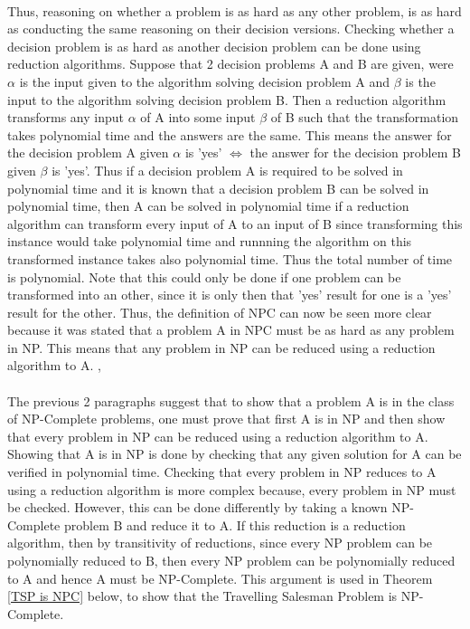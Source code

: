 \documentclass{article}
\begin{document}
\\
Thus, reasoning on whether a problem is as hard as any other problem, is as hard as conducting the same reasoning on their decision versions. Checking whether a decision problem is as hard as another decision problem can be done using reduction algorithms. Suppose that 2 decision problems A and B are given, were $\alpha$ is the input given to the algorithm solving decision problem A and $\beta$ is the input to the algorithm solving decision problem B. Then a reduction algorithm transforms any input $\alpha$ of A into some input $\beta$ of B such that the transformation takes polynomial time and the answers are the same. This means the answer for the decision problem A given $\alpha$ is 'yes' $\iff$ the answer for the decision problem B given $\beta$ is 'yes'. Thus if a decision problem A is required to be solved in polynomial time and it is known that a decision problem B can be solved in polynomial time, then A can be solved in polynomial time if a reduction algorithm can transform every input of A to an input of B since transforming this instance would take polynomial time and runnning the algorithm on this transformed instance takes also polynomial time. Thus the total number of time is polynomial. Note that this could only be done if one problem can be transformed into an other, since it is only then that 'yes' result for one is a 'yes' result for the other. Thus, the definition of NPC can now be seen more clear because it was stated that a problem A in NPC must be as hard as any problem in NP. This means that any problem in NP can be reduced using a reduction algorithm to A. \cite{geeksforgeeks_2018_2}, \cite{cormen_leiserson_rivest_stein}\\
\\
The previous 2 paragraphs suggest that to show that a problem A is in the class of NP-Complete problems, one must prove that first A is in NP and then show that every problem in NP can be reduced using a reduction algorithm to A. Showing that A is in NP is done by checking that any given solution for A can be verified in polynomial time. Checking that every problem in NP reduces to A using a reduction algorithm is more complex because, every problem in NP must be checked. However, this can be done differently by taking a known NP-Complete problem B and reduce it to A. If this reduction is a reduction algorithm, then by transitivity of reductions, since every NP problem can be polynomially reduced to B, then every NP problem can be polynomially reduced to A and hence A must be NP-Complete. This argument is used in Theorem \ref{TSP is NPC} below, to show that the Travelling Salesman Problem is NP-Complete. \cite{geeksforgeeks_2018_2}
\end{document}

